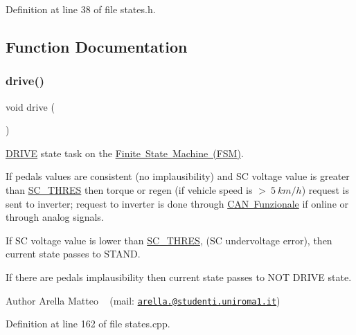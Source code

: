 Definition at line 38 of file states.\+h.



\subsection{Function Documentation}
\mbox{\label{group__stages__group_ga928e32686c7e00c1ecde24c3da3019f7}} 
\subsubsection{\texorpdfstring{drive()}{drive()}}
{\footnotesize\ttfamily void drive (\begin{DoxyParamCaption}{ }\end{DoxyParamCaption})}



\mbox{\hyperlink{_f_s_m_page_DRIVE}{D\+R\+I\+VE}} state task on the \mbox{\hyperlink{_f_s_m_page}{Finite State Machine (F\+SM)}}. 

If pedals values are consistent (no implausibility) and SC voltage value is greater than \mbox{\hyperlink{group__stages__group_ga9688af4f17ae88b4d149269d71b7ff1f}{S\+C\+\_\+\+T\+H\+R\+ES}} then torque or regen (if vehicle speed is $>\ 5\ km/h$) request is sent to inverter; request to inverter is done through \mbox{\hyperlink{CAN_funzionale_page}{C\+AN Funzionale}} if online or through analog signals.

If SC voltage value is lower than \mbox{\hyperlink{group__stages__group_ga9688af4f17ae88b4d149269d71b7ff1f}{S\+C\+\_\+\+T\+H\+R\+ES}}, (SC undervoltage error), then current state passes to S\+T\+A\+ND.

If there are pedals implausibility then current state passes to N\+OT D\+R\+I\+VE state.

\begin{DoxyAuthor}{Author}
Arella Matteo ~\newline
 (mail\+: \href{mailto:arella.1646983@studenti.uniroma1.it}{\tt arella.@studenti.\+uniroma1.\+it}) 
\end{DoxyAuthor}


Definition at line 162 of file states.\+cpp.

\mbox{\label{group__stages__group_ga2802a8c3f0174f4e54dd2381968212a0}} 
